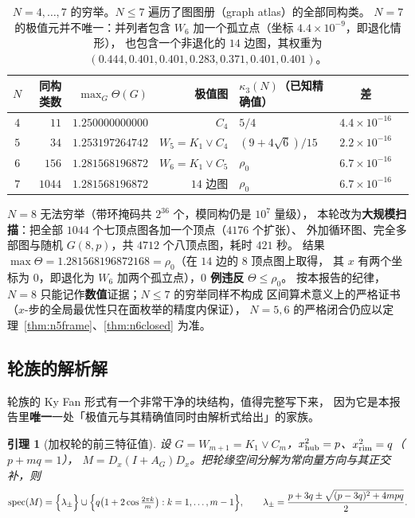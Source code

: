 \documentclass[UTF8,11pt]{ctexart}
\newtheorem{lemma}[theorem]{引理}
\theoremstyle{definition}
\begin{document}
\begin{table}[h]\centering\small
\begin{tabular}{crrrlcl}
\toprule
$N$ & 同构类数 & $\max_G\Theta(G)$ & 极值图 & $\kappa_3(N)$（已知精确值） & 差 \\
\midrule
$4$ & $11$   & $1.250000000000$ & $C_4$              & $5/4$                 & $4.4\times10^{-16}$\\
$5$ & $34$   & $1.253197264742$ & $W_5=K_1\vee C_4$  & $(9+4\sqrt6)/15$      & $2.2\times10^{-16}$\\
$6$ & $156$  & $1.281568196872$ & $W_6=K_1\vee C_5$  & $\rho_0$              & $6.7\times10^{-16}$\\
$7$ & $1044$ & $1.281568196872$ & $14$ 边图 & $\rho_0$              & $6.7\times10^{-16}$\\
\bottomrule
\end{tabular}
\caption{$N=4,\dots,7$ 的穷举。$N\le7$ 遍历了图图册（graph atlas）的全部同构类。
$N=7$ 的极值元并不唯一：并列者包含 $W_6$ 加一个孤立点（坐标 $4.4\times10^{-9}$，即退化情形），
也包含一个非退化的 $14$ 边图，其权重为 $(0.444,0.401,0.401,0.283,0.371,0.401,0.401)$。
}\label{tab:r20small}
\end{table}

$N=8$ 无法穷举（带环掩码共 $2^{36}$ 个，模同构仍是 $10^7$ 量级），
本轮改为\textbf{大规模扫描}：把全部 $1044$ 个七顶点图各加一个顶点（$4176$ 个扩张）、
外加循环图、完全多部图与随机 $G(8,p)$，共 $4712$ 个八顶点图，耗时 $421$ 秒。
结果 $\max\Theta=1.281568196872168=\rho_0$（在 $14$ 边的 $8$ 顶点图上取得，
其 $x$ 有两个坐标为 $0$，即退化为 $W_6$ 加两个孤立点），\textbf{$0$ 例违反} $\Theta\le\rho_0$。
按本报告的纪律，$N=8$ 只能记作\textbf{数值}证据；$N\le7$ 的穷举同样不构成
区间算术意义上的严格证书（$x$-步的全局最优性只在面枚举的精度内保证），
$N=5,6$ 的严格闭合仍应以定理~\ref{thm:n5frame}、\ref{thm:n6closed} 为准。

\subsection{轮族的解析解}\label{sec:r20:wheel}

轮族的 Ky Fan 形式有一个非常干净的块结构，值得完整写下来，
因为它是本报告里\textbf{唯一}一处「极值元与其精确值同时由解析式给出」的家族。

\begin{lemma}[加权轮的前三特征值]\label{lem:r20wheel}
设 $G=W_{m+1}=K_1\vee C_m$，$x_{\rm hub}^2=p$、$x_{\rm rim}^2=q$（$p+mq=1$），
$M=D_x(I+A_G)D_x$。把轮缘空间分解为常向量方向与其正交补，则
\begin{equation}\label{eq:r20wheelspec}
\operatorname{spec}(M)=\Bigl\{\lambda_\pm\Bigr\}\cup\Bigl\{q\bigl(1+2\cos\tfrac{2\pi k}{m}\bigr):k=1,\dots,m-1\Bigr\},
\qquad
\lambda_\pm=\frac{p+3q\pm\sqrt{(p-3q)^2+4mpq}}2 .
\end{equation}
\end{lemma}
\end{document}
